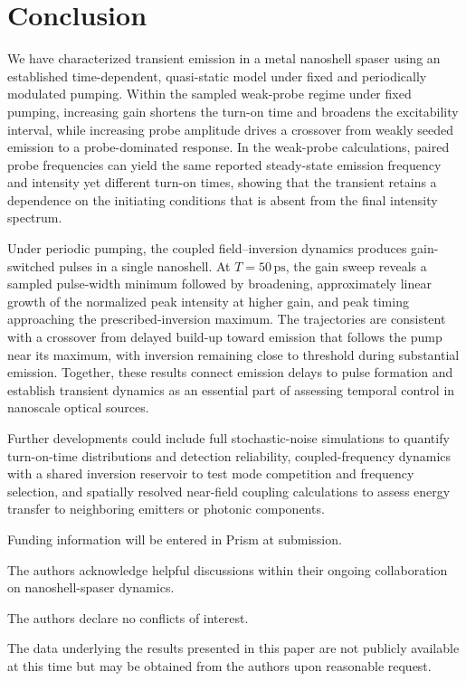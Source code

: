\documentclass{optica-article}
\begin{document}
\section{Conclusion}
\label{sec:conclusion}

We have characterized transient emission in a metal nanoshell spaser using an established time-dependent, quasi-static model under fixed and periodically modulated pumping. Within the sampled weak-probe regime under fixed pumping, increasing gain shortens the turn-on time and broadens the excitability interval, while increasing probe amplitude drives a crossover from weakly seeded emission to a probe-dominated response. In the weak-probe calculations, paired probe frequencies can yield the same reported steady-state emission frequency and intensity yet different turn-on times, showing that the transient retains a dependence on the initiating conditions that is absent from the final intensity spectrum.

Under periodic pumping, the coupled field--inversion dynamics produces gain-switched pulses in a single nanoshell. At $T=50\,\mathrm{ps}$, the gain sweep reveals a sampled pulse-width minimum followed by broadening, approximately linear growth of the normalized peak intensity at higher gain, and peak timing approaching the prescribed-inversion maximum. The trajectories are consistent with a crossover from delayed build-up toward emission that follows the pump near its maximum, with inversion remaining close to threshold during substantial emission. Together, these results connect emission delays to pulse formation and establish transient dynamics as an essential part of assessing temporal control in nanoscale optical sources.

Further developments could include full stochastic-noise simulations to quantify turn-on-time distributions and detection reliability, coupled-frequency dynamics with a shared inversion reservoir to test mode competition and frequency selection, and spatially resolved near-field coupling calculations to assess energy transfer to neighboring emitters or photonic components.

\begin{backmatter}
Funding information will be entered in Prism at submission.

The authors acknowledge helpful discussions within their ongoing collaboration on nanoshell-spaser dynamics.

The authors declare no conflicts of interest.

The data underlying the results presented in this paper are not publicly available at this time but may be obtained from the authors upon reasonable request.
\end{backmatter}


\end{document}
